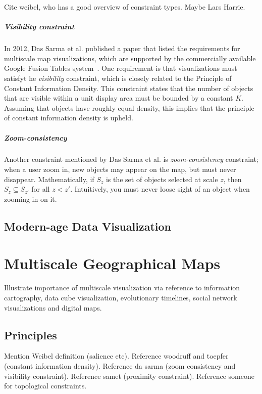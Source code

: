 \documentclass[11pt, oneside]{report}   	%
\begin{document}
Cite weibel, who has a good overview of constraint types. Maybe Lars Harrie.

\paragraph{Visibility constraint}
In 2012, Das Sarma et al. published a paper that listed the requirements for multiscale map visualizations, which are supported by the commercially available Google Fusion Tables system~\cite{sarma2012fusiontables}. One requirement is that visualizations must satisfyt he \emph{visibility} constraint, which is closely related to the Principle of Constant Information Density. This constraint states that the number of objects that are visible within a unit display area must be bounded by a constant $K$. Assuming that objects have roughly equal density, this implies that the principle of constant information density is upheld.


\paragraph{Zoom-consistency}
Another constraint mentioned by Das Sarma et al. is  \emph{zoom-consistency} constraint; when a user zoom in, new objects may appear on the map, but must never disappear. Mathematically, if $S_z$ is the set of objects selected at scale $z$, then $S_z \subseteq S_{z'}$ for all $z < z'$. Intuitively, you must never loose sight of an object when zooming in on it.



\section{Modern-age Data Visualization}

\chapter{Multiscale Geographical Maps}
Illustrate importance of multiscale visualization via reference to information cartography, data cube visualization, evolutionary timelines, social network visualizations and digital maps.

\section{Principles}
Mention Weibel definition (salience etc). Reference woodruff and toepfer (constant information density). Reference da sarma (zoom consistency and visibility constraint). Reference samet (proximity constraint). Reference someone for topological constraints.
\end{document}
